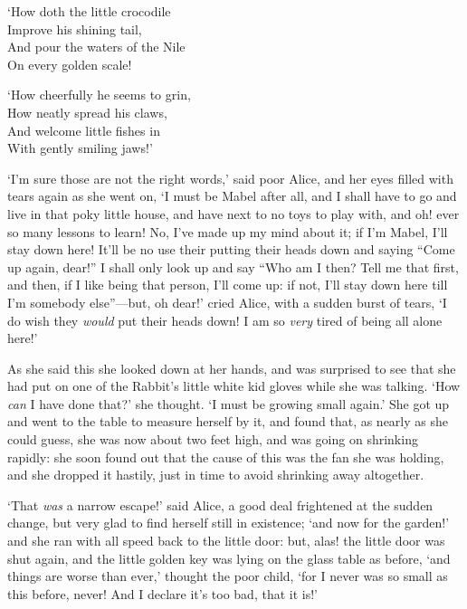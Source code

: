 \documentclass[12pt,openany]{memoir}
\renewenvironment{quote}%
  {\list{}{\leftmargin=2\parindent\rightmargin=0in}\item[]}%
  {\endlist}
\begin{document}
\begin{quote}
`How doth the little crocodile\\
\hspace*{1em}Improve his shining tail,\\
And pour the waters of the Nile\\
\hspace*{1em}On every golden scale!

`How cheerfully he seems to grin,\\
\hspace*{1em}How neatly spread his claws,\\
And welcome little fishes in\\
\hspace*{1em}With gently smiling jaws!'
\end{quote}

`I'm sure those are not the right words,' said poor Alice, and her eyes filled with tears again as she went on, `I must be Mabel after all, and I shall have to go and live in that poky little house, and have next to no toys to play with, and oh! ever so many lessons to learn! No, I've made up my mind about it; if I'm Mabel, I'll stay down here! It'll be no use their putting their heads down and saying ``Come up again, dear!'' I shall only look up and say ``Who am I then? Tell me that first, and then, if I like being that person, I'll come up: if not, I'll stay down here till I'm somebody else''---but, oh dear!' cried Alice, with a sudden burst of tears, `I do wish they \textit{would} put their heads down! I am so \textit{very} tired of being all alone here!'

As she said this she looked down at her hands, and was surprised to see that she had put on one of the Rabbit's little white kid gloves while she was talking. `How \textit{can} I have done that?' she thought. `I must be growing small again.' She got up and went to the table to measure herself by it, and found that, as nearly as she could guess, she was now about two feet high, and was going on shrinking rapidly: she soon found out that the cause of this was the fan she was holding, and she dropped it hastily, just in time to avoid shrinking away altogether.

`That \textit{was} a narrow escape!' said Alice, a good deal frightened at the sudden change, but very glad to find herself still in existence; `and now for the garden!' and she ran with all speed back to the little door: but, alas! the little door was shut again, and the little golden key was lying on the glass table as before, `and things are worse than ever,' thought the poor child, `for I never was so small as this before, never! And I declare it's too bad, that it is!'
\end{document}
